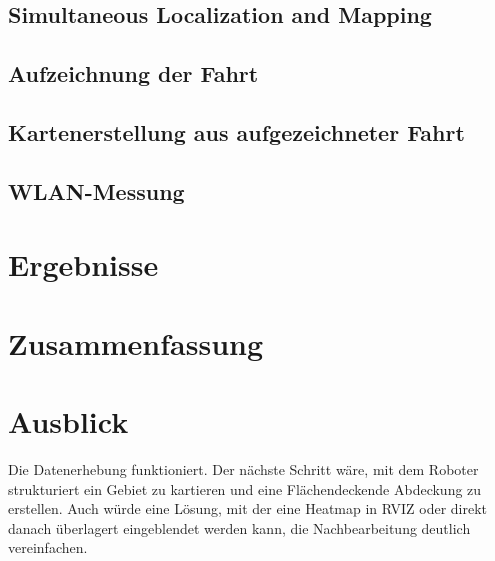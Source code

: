 \documentclass{scrartcl}%
\begin{document}
\subsection{Simultaneous Localization and Mapping}

\subsection{Aufzeichnung der Fahrt}

\subsection{Kartenerstellung aus aufgezeichneter Fahrt}

\subsection{WLAN-Messung}

\section{Ergebnisse}

\section{Zusammenfassung}

\newpage
\section{Ausblick}
Die Datenerhebung funktioniert. Der nächste Schritt wäre, mit dem Roboter strukturiert ein Gebiet zu kartieren und eine Flächendeckende Abdeckung zu erstellen. Auch würde eine Lösung, mit der eine Heatmap in RVIZ oder direkt danach überlagert eingeblendet werden kann, die Nachbearbeitung deutlich vereinfachen.


\newpage
\begin{flushleft}
	\printbibliography
\end{flushleft}
\end{document}
